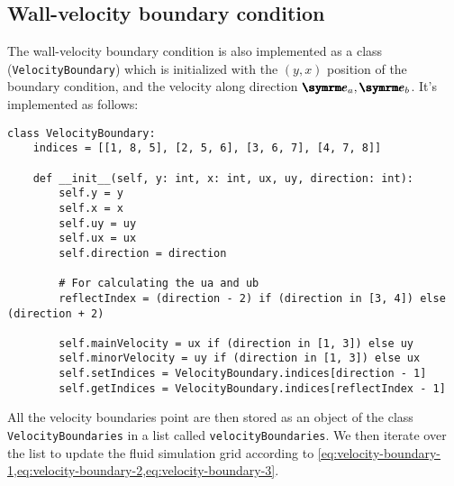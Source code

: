 \subsection{Wall-velocity boundary condition}

The wall-velocity boundary condition is also implemented as a class (\texttt{VelocityBoundary}) which is initialized with the $(y, x)$ position of the boundary condition, and the velocity along direction $\vv{e}_a, \vv{e}_b$. It's implemented as follows:
\begin{verbatim}
class VelocityBoundary:
    indices = [[1, 8, 5], [2, 5, 6], [3, 6, 7], [4, 7, 8]]

    def __init__(self, y: int, x: int, ux, uy, direction: int):
        self.y = y
        self.x = x
        self.uy = uy
        self.ux = ux
        self.direction = direction

        # For calculating the ua and ub
        reflectIndex = (direction - 2) if (direction in [3, 4]) else (direction + 2)

        self.mainVelocity = ux if (direction in [1, 3]) else uy
        self.minorVelocity = uy if (direction in [1, 3]) else ux
        self.setIndices = VelocityBoundary.indices[direction - 1]
        self.getIndices = VelocityBoundary.indices[reflectIndex - 1]
\end{verbatim}

All the velocity boundaries point are then stored as an object of the class \texttt{VelocityBoundaries} in a list called \texttt{velocityBoundaries}. We then iterate over the list to update the fluid simulation grid according to \cref{eq:velocity-boundary-1,eq:velocity-boundary-2,eq:velocity-boundary-3}.

